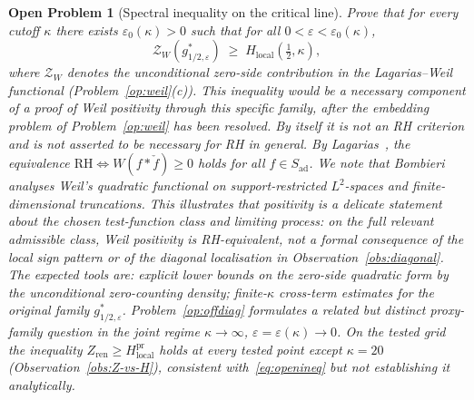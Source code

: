 \documentclass[11pt]{article}
\newtheorem{openproblem}[theorem]{Open Problem}
\newcommand{\Hlocal}{H_{\mathrm{local}}}
\newcommand{\Sad}{S_{\mathrm{ad}}}
\newcommand{\Zren}{Z_{\mathrm{ren}}}
\begin{document}
\begin{openproblem}[Spectral inequality on the critical line]\label{op:spectral-ineq}
Prove that for every cutoff $\kappa$ there exists
$\varepsilon_0(\kappa)>0$ such that for all
$0<\varepsilon<\varepsilon_0(\kappa)$,
\begin{equation}\label{eq:openineq}
\mathcal{Z}_W(g^*_{1/2,\varepsilon})
\;\ge\; \Hlocal(\tfrac12,\kappa),
\end{equation}
where $\mathcal{Z}_W$ denotes the unconditional zero-side
contribution in the Lagarias--Weil functional
(Problem~\ref{op:weil}(c)).
This inequality would be a necessary component of
a proof of Weil positivity through this specific family,
after the embedding problem of Problem~\ref{op:weil} has been
resolved.
By itself it is not an RH criterion and is not
asserted to be necessary for RH in general.
By Lagarias~\cite{Lagarias}, the equivalence
$\mathrm{RH}\iff W(f*\check f)\ge 0$ holds for all
$f\in\Sad$.
We note that Bombieri~\cite{Bombieri2000} analyses Weil's
quadratic functional on support-restricted $L^2$-spaces and
finite-dimensional truncations.
This illustrates that positivity is a delicate statement about
the chosen test-function class and limiting process: on the full
relevant admissible class, Weil positivity is RH-equivalent,
not a formal consequence of the local sign pattern or of the
diagonal localisation in Observation~\ref{obs:diagonal}.
The expected tools are: explicit lower bounds on the zero-side
quadratic form by the unconditional zero-counting density;
finite-$\kappa$ cross-term estimates for the original family
$g^*_{1/2,\varepsilon}$.
Problem~\ref{op:offdiag} formulates a related but distinct
proxy-family question in the joint regime
$\kappa\to\infty$, $\varepsilon=\varepsilon(\kappa)\to 0$.
On the tested grid the inequality
$\Zren\ge\Hlocal^{\mathrm{pr}}$ holds at every
tested point except $\kappa=20$ (Observation~\ref{obs:Z-vs-H}),
consistent with~\eqref{eq:openineq} but not establishing it
analytically.
\end{openproblem}
\end{document}
